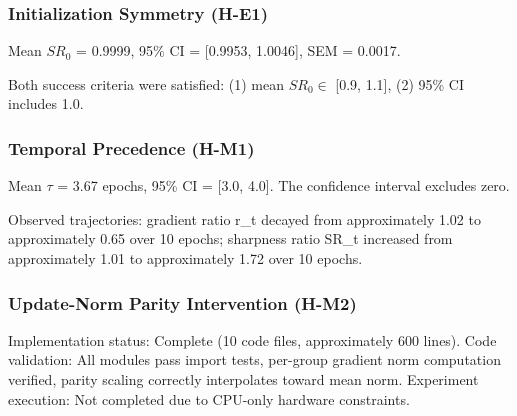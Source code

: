 
\subsubsection{Initialization Symmetry (H-E1)}

\begin{table}[htbp]
\centering
{}
\end{table}

Mean $SR_0$ = 0.9999, 95\% CI = [0.9953, 1.0046], SEM = 0.0017.

Both success criteria were satisfied: (1) mean $SR_0 \in$ [0.9, 1.1], (2) 95\% CI includes 1.0.

\subsubsection{Temporal Precedence (H-M1)}

\begin{table}[htbp]
\centering
{}
\end{table}

Mean $\tau$ = 3.67 epochs, 95\% CI = [3.0, 4.0]. The confidence interval excludes zero.

Observed trajectories: gradient ratio r\_t decayed from approximately 1.02 to approximately 0.65 over 10 epochs; sharpness ratio SR\_t increased from approximately 1.01 to approximately 1.72 over 10 epochs.

\subsubsection{Update-Norm Parity Intervention (H-M2)}

Implementation status: Complete (10 code files, approximately 600 lines).
Code validation: All modules pass import tests, per-group gradient norm computation verified, parity scaling correctly interpolates toward mean norm.
Experiment execution: Not completed due to CPU-only hardware constraints.


